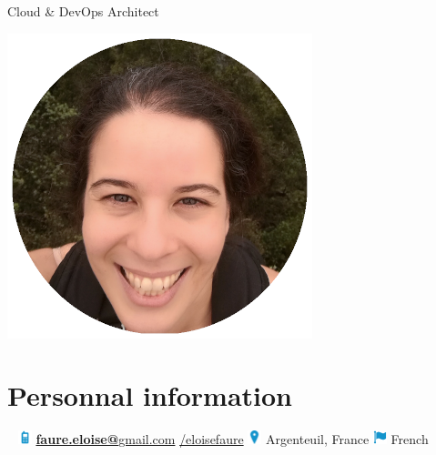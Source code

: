\documentclass[]{friggeri-cv}
\begin{document}
	
		 {Cloud \& DevOps Architect}
      

\begin{aside}
  \includegraphics[scale=0.36]{img/eloise.png}
  ~
  \section{Personnal information}
  ~    
 \ifdefined\PhoneNumber %
 	{\includegraphics[width=0.4cm]{img/mobile_icon.pdf}} \textbf{ \PhoneNumber }  \vspace{6pt} 
  \fi %
  \href{mailto:faure.eloise@gmail.com}{\textbf{faure.eloise@}gmail.com}\vspace{4pt}
%
  \href{https://fr.linkedin.com/in/eloisefaure}{ /eloisefaure}
%
{\includegraphics[width=0.4cm]{img/localisation.png}}  Argenteuil, France \vspace{4pt}
%
{\includegraphics[width=0.4cm]{img/nationality.png}}    \enspace French 
~

\end{aside}
\end{document}
